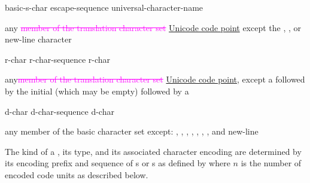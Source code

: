 \documentclass{wg21}
\newcommand{\addedTranslation}[1]{\textcolor{addclrTwo}{\uline{#1}}}
\newcommand{\removedTranslation}[1]{\textcolor{magenta}{\sout{#1}}}
\newcommand{\changedTranslation}[2]{\removedTranslation{#1} \addedTranslation{#2}}
\begin{document}
\begin{bnf}
    \br
    basic-s-char\br
    escape-sequence\br
    universal-character-name
\end{bnf}

\begin{bnf}
    \br
    \textnormal{any \changedTranslation{member of the translation character set}{Unicode code point} except the ,}\br
    \bnfindent\textnormal{, or new-line character}
\end{bnf}

\begin{bnf}
    \br
      \terminal{(}  \terminal{)}  
\end{bnf}

\begin{bnf}
    \br
    r-char\br
    r-char-sequence r-char
\end{bnf}

\begin{bnf}
    \br
    \textnormal{any\changedTranslation{member of the translation character set}{Unicode code point}, except a  followed by}\br
    \bnfindent\textnormal{the initial  (which may be empty) followed by a }
\end{bnf}

\begin{bnf}
    \br
    d-char\br
    d-char-sequence d-char
\end{bnf}

\begin{bnf}
    \br
    \textnormal{any member of the basic character set except:}\br
    \bnfindent\textnormal{, , , ,}\br
    \bnfindent\textnormal{, , , and new-line}
\end{bnf}

\pnum
{}%
%
%
%
%
%
%
%
%
The kind of a ,
its type, and
its associated character encoding
are determined by its encoding prefix and sequence of
s or s
as defined by 
where $n$ is the number of encoded code units as described below.
\end{document}
